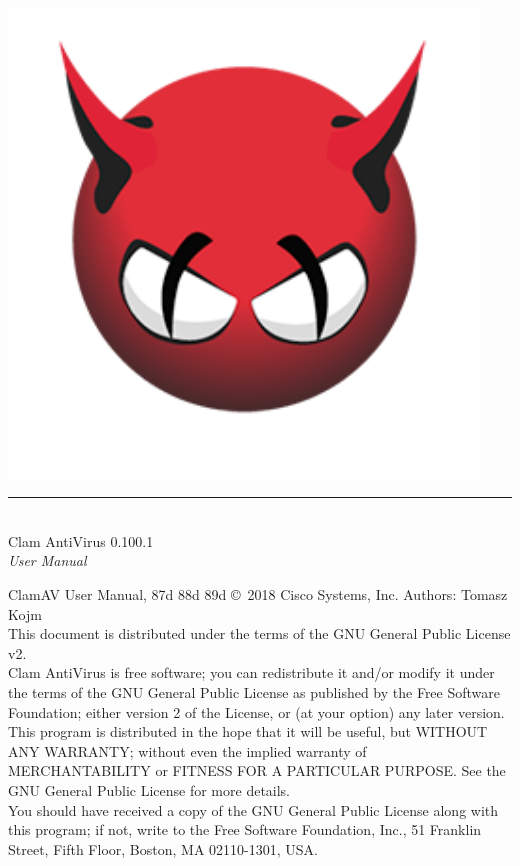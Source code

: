 \documentclass[a4paper,titlepage,12pt]{article}
\date{}
\begin{document}
    \setcounter{page}{0}

    \pagestyle{empty}
    \includegraphics[width=353pt]{html/demon.png}
    \vspace{3cm}
    \begin{flushright}
	\rule[-1ex]{8cm}{3pt}\\
	\huge Clam AntiVirus 0.100.1\\
	\huge \emph{User Manual}\\
    \end{flushright}

    \newpage
    \pagestyle{fancy}
    \tableofcontents
    \vspace{1.0cm}

    \noindent
    \begin{boxedminipage}[b]{\textwidth}
    ClamAV User Manual,
87d
88d
89d
    \copyright \  2018 Cisco Systems, Inc.
    Authors: Tomasz Kojm\\
    This document is distributed under the terms of the GNU General
    Public License v2.\\

    Clam AntiVirus is free software; you can redistribute it and/or modify
    it under the terms of the GNU General Public License as published by
    the Free Software Foundation; either version 2 of the License, or
    (at your option) any later version.\\

    This program is distributed in the hope that it will be useful,
    but WITHOUT ANY WARRANTY; without even the implied warranty of
    MERCHANTABILITY or FITNESS FOR A PARTICULAR PURPOSE.  See the
    GNU General Public License for more details.\\

    You should have received a copy of the GNU General Public License
    along with this program; if not, write to the Free Software
    Foundation, Inc., 51 Franklin Street, Fifth Floor, Boston,
    MA 02110-1301, USA.
    \end{boxedminipage}
\end{document}
